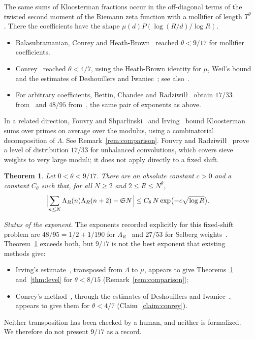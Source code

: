 \documentclass[11pt]{amsart}
\newtheorem{theorem}{Theorem}[section]
\theoremstyle{definition}
\theoremstyle{remark}
\numberwithin{equation}{section}
\begin{document}
The same sums of Kloosterman fractions occur in the off-diagonal terms of the
twisted second moment of the Riemann zeta function with a mollifier of
length $T^\theta$.  There the coefficients have the shape
$\mu(d)P(\log(R/d)/\log R)$.
\begin{itemize}
\item Balasubramanian, Conrey and Heath-Brown~\cite{BCHB} reached
$\theta<9/17$ for mollifier coefficients.
\item Conrey~\cite{Con89} reached $\theta<4/7$, using the Heath-Brown
identity for $\mu$, Weil's bound and the estimates of Deshouillers and
Iwaniec~\cite{DI82}; see also~\cite{PR18}.
\item For arbitrary coefficients, Bettin, Chandee and
Radziwi\l\l~\cite{BCR} obtain $17/33$ from~\cite{BC} and $48/95$
from~\cite{DFI}, the same pair of exponents as above.
\end{itemize}
In a related direction, Fouvry and Shparlinski~\cite{FS11} and
Irving~\cite{Irv14} bound Kloosterman sums over primes on average over the
modulus, using a combinatorial decomposition of $\Lambda$.  See
Remark~\ref{rem:comparison}.  Fouvry and Radziwi\l\l~\cite{FR22} prove a
level of distribution $17/33$ for unbalanced convolutions, which covers
sieve weights to very large moduli; it does not apply directly to a fixed
shift.

\begin{theorem}\label{thm:LambdaR}
Let $0<\theta<9/17$.  There are an absolute constant $c>0$ and a constant
$C_\theta$ such that, for all $N\ge2$ and $2\le R\le N^\theta$,
\[
 \Bigl|\sum_{n\le N}\Lambda_R(n)\Lambda_R(n+2)-\mathfrak S N\Bigr|
 \le C_\theta\,N\exp\bigl(-c\sqrt{\log R}\bigr).
\]
\end{theorem}

\emph{Status of the exponent.}  The exponents recorded explicitly for this
fixed-shift problem are $48/95=1/2+1/190$ for $\Lambda_R$~\cite{CL} and
$27/53$ for Selberg weights~\cite{Walker}.  Theorem~\ref{thm:LambdaR}
exceeds both, but $9/17$ is not the best exponent that existing methods
give:
\begin{itemize}
\item Irving's estimate~\cite[Theorem~1.3]{Irv14}, transposed from $\Lambda$
to $\mu$, appears to give Theorems~\ref{thm:LambdaR} and~\ref{thm:level} for
$\theta<8/15$ (Remark~\ref{rem:comparison});
\item Conrey's method~\cite{Con89}, through the estimates of Deshouillers
and Iwaniec~\cite{DI82}, appears to give them for $\theta<4/7$
(Claim~\ref{claim:conrey}).
\end{itemize}
Neither transposition has been checked by a human, and neither is
formalized.  We therefore do not present $9/17$ as a record.
\end{document}
